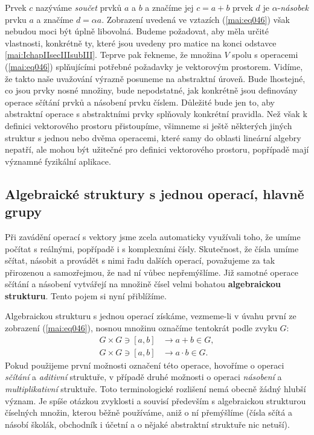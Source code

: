     Prvek \(c\) nazýváme \emph{součet} prvků \(a\) a \(b\) a značíme jej \(c = a + b\) prvek \(d\) 
    je \(\alpha\)-\emph{násobek} prvku \(a\) a značíme \(d = \alpha a\). Zobrazení uvedená ve 
    vztazích (\ref{mai:eq046}) však nebudou moci být úplně libovolná. Budeme požadovat, aby měla 
    určité vlastnosti, konkrétně ty, které jsou uvedeny pro matice na konci odstavce 
    \ref{mai:IchapIIsecIIIsubIII}. Teprve pak řekneme, že množina \(V\) spolu s operacemi 
    (\ref{mai:eq046}) splňujícími potřebné požadavky je vektorovým prostorem. Vidíme, že takto naše 
    uvažování výrazně posuneme na abstraktní úroveň. Bude lhostejné, co jsou prvky nosné množiny, 
    bude nepodstatné, jak konkrétně jsou definovány operace sčítání prvků a násobení prvku číslem. 
    Důležité bude jen to, aby abstraktní operace s abstraktními prvky splňovaly konkrétní pravidla. 
    Než však k definici vektorového prostoru přistoupíme, všimneme si ještě některých jiných 
    struktur s jednou nebo dvěma operacemi, které samy do oblasti lineární algebry nepatří, ale 
    mohou být užitečné pro definici vektorového prostoru, popřípadě mají významné fyzikální 
    aplikace.
      
      \subsection{Algebraické struktury s jednou operací, hlavně grupy}
        Při zavádění operací s vektory jsme zcela automaticky využívali toho, že umíme počítat s 
        reálnými, popřípadě i s komplexními čísly. Skutečnost, že čísla umíme sčítat, násobit a 
        provádět s nimi řadu dalších operací, považujeme za tak přirozenou a samozřejmou, že nad ní 
        vůbec nepřemýšlíme. Již samotné operace sčítání a násobení vytvářejí na množině čísel velmi 
        bohatou \textbf{algebraickou strukturu}. Tento pojem si nyní přiblížíme. 
        
        Algebraickou strukturu s jednou operací získáme, vezmeme-li v úvahu první ze zobrazení 
        (\ref{mai:eq046}), nosnou množinu označíme tentokrát podle zvyku \(G\):
        \begin{subequations}\label{mai:eq047}
          \begin{align}
            G \times G \ni [a,b] &\longrightarrow a + b \in G,                  \label{mai:eq047a}\\
            G \times G \ni [a,b] &\longrightarrow a \cdot b \in G.              \label{mai:eq047b}
          \end{align}
        \end{subequations}
        Pokud použijeme první možnosti označení této operace, hovoříme o operaci \emph{sčítání} a 
        \emph{aditivní} struktuře, v případě druhé možnosti o operaci \emph{násobení} a 
        \emph{multiplikativní} struktuře. Toto terminologické rozlišení nemá obecně žádný hlubší 
        význam. Je spíše otázkou zvyklosti a souvisí především s algebraickou strukturou číselných 
        množin, kterou běžně používáme, aniž o ní přemýšlíme (čísla sčítá a násobí školák, 
        obchodník i účetní a o nějaké abstraktní struktuře nic netuší).
        
